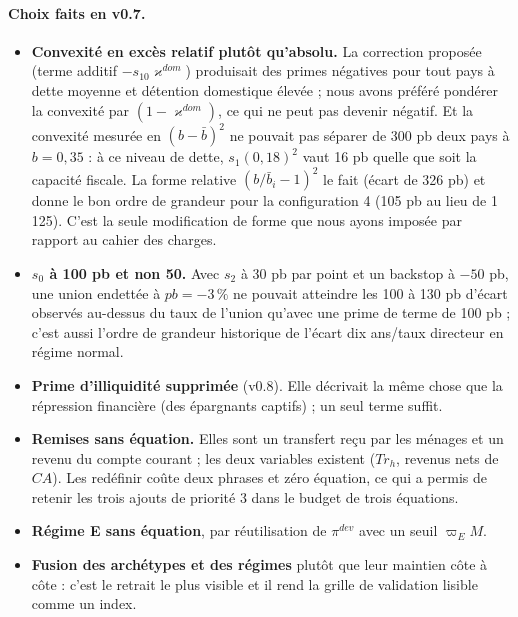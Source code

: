 \documentclass[11pt,a4paper]{article}
\begin{document}
\paragraph{Choix faits en v0.7.}
\begin{itemize}
\item \textbf{Convexité en excès relatif plutôt qu'absolu.} La correction proposée (terme additif $-s_{10}\varkappa^{dom}$) produisait des primes négatives pour tout pays à dette moyenne et détention domestique élevée ; nous avons préféré pondérer la convexité par $(1-\varkappa^{dom})$, ce qui ne peut pas devenir négatif. Et la convexité mesurée en $(b-\bar b)^2$ ne pouvait pas séparer de 300 pb deux pays à $b=0{,}35$ : à ce niveau de dette, $s_1(0{,}18)^2$ vaut 16 pb quelle que soit la capacité fiscale. La forme relative $(b/\bar b_i-1)^2$ le fait (écart de 326 pb) et donne le bon ordre de grandeur pour la configuration 4 (105 pb au lieu de 1\,125). C'est la seule modification de forme que nous ayons imposée par rapport au cahier des charges.
\item \textbf{$s_0$ à 100 pb et non 50.} Avec $s_2$ à 30 pb par point et un backstop à $-50$ pb, une union endettée à $pb=-3\,\%$ ne pouvait atteindre les 100 à 130 pb d'écart observés au-dessus du taux de l'union qu'avec une prime de terme de 100 pb ; c'est aussi l'ordre de grandeur historique de l'écart dix ans/taux directeur en régime normal.
\item \textbf{Prime d'illiquidité supprimée} (v0.8). Elle décrivait la même chose que la répression financière (des épargnants captifs) ; un seul terme suffit.
\item \textbf{Remises sans équation.} Elles sont un transfert reçu par les ménages et un revenu du compte courant ; les deux variables existent ($Tr_h$, revenus nets de $CA$). Les redéfinir coûte deux phrases et zéro équation, ce qui a permis de retenir les trois ajouts de priorité 3 dans le budget de trois équations.
\item \textbf{Régime E sans équation}, par réutilisation de $\pi^{dev}$ avec un seuil $\varpi_E M$.
\item \textbf{Fusion des archétypes et des régimes} plutôt que leur maintien côte à côte : c'est le retrait le plus visible et il rend la grille de validation lisible comme un index.
\end{itemize}
\end{document}
